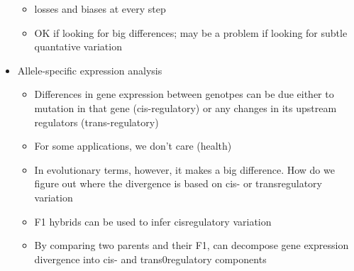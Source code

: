 \documentclass{article}
\begin{document}
\begin{itemize}
\begin{itemize}
            \item losses and biases at every step
            \item OK if looking for big differences; may be a problem if looking for subtle quantative variation
        \end{itemize}
        \item Allele-specific expression analysis
        \begin{itemize}
            \item Differences in gene expression between genotpes can be due either to mutation in that gene (cis-regulatory) or any changes in its upstream regulators (trans-regulatory)
            \item For some applications, we don't care (health)
            \item In evolutionary terms, however, it makes a big difference.  How do we figure out where the divergence is based on cis- or transregulatory variation
            \item F1 hybrids can be used to infer cisregulatory variation
            \item By comparing two parents and their F1, can decompose gene expression divergence into cis- and trans0regulatory components
        \end{itemize}
    \end{itemize}
\end{document}
